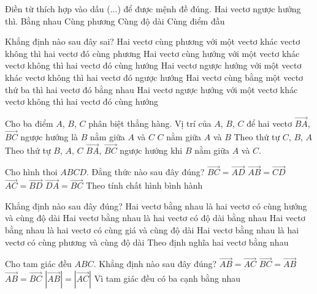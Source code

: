 \begin{ex}%
	Điền từ thích hợp vào dấu (...) để được mệnh đề đúng. Hai vectơ ngược hướng thì.
	\choice
	{Bằng nhau}
	{\True Cùng phương}
	{Cùng độ dài}
	{Cùng điểm đầu}
\end{ex}

\begin{ex}%
	Khẳng định nào sau đây sai?
	\choice
	{Hai vectơ cùng phương với một vectơ khác vectơ không thì hai vectơ đó cùng phương}
	{ Hai vectơ cùng hướng với một vectơ khác vectơ không thì hai vectơ đó cùng hướng}
	{\True Hai vectơ ngược hướng với một vectơ khác vectơ không thì hai vectơ đó ngược hướng}
	{Hai vectơ cùng bằng một vectơ thứ ba thì hai vectơ đó bằng nhau}
	\loigiai
	{Hai vectơ ngược hướng với một vectơ khác vectơ không thì hai vectơ đó cùng hướng}
\end{ex}

\begin{ex}%
	Cho ba điểm $A$, $B$, $C $ phân biệt thẳng hàng. Vị trí của $A$, $B$, $C$ để hai vectơ $\overrightarrow{BA}$, $\overrightarrow{BC}$ ngược hướng là
	\choice
	{\True $B$ nằm giữa $A$ và $C$}
	{$C$ nằm giữa $A$ và $B$}
	{Theo thứ tự $C$, $B$, $A$}
	{Theo thứ tự $B$, $A$, $C$}
	\loigiai
	{$\overrightarrow{BA}$, $\overrightarrow{BC}$ ngược hướng khi $B$ nằm giữa $A $ và $C$.}
\end{ex}


\begin{ex}%
	Cho hình thoi $ABCD$. Đẳng thức nào sau đây đúng?
	\choice
	{\True $\overrightarrow{BC}=\overrightarrow{AD}$}
	{$\overrightarrow{AB}=\overrightarrow{CD}$}
	{$\overrightarrow{AC}=\overrightarrow{BD}$}
	{$\overrightarrow{DA}=\overrightarrow{BC}$}
	\loigiai
	{Theo tính chất hình bình hành}
\end{ex}

\begin{ex}%
	Khẳng định nào sau đây đúng?
	\choice
	{\True Hai vectơ bằng nhau là hai vectơ có cùng hướng và cùng độ dài}
	{Hai vectơ bằng nhau là hai vectơ có độ dài bằng nhau}
	{Hai vectơ bằng nhau là hai vectơ có cùng giá và cùng độ dài}
	{Hai vectơ bằng nhau là hai vectơ có cùng phương và cùng độ dài}
	\loigiai
	{Theo định nghĩa hai vectơ bằng nhau}
\end{ex}

\begin{ex}%
	Cho tam giác đều $ABC$. Khẳng định nào sau đây đúng?
	\choice
	{$\overrightarrow{AB}=\overrightarrow{AC}$}
	{$\overrightarrow{BC}=\overrightarrow{AB}$}
	{$\overrightarrow{AB}=\overrightarrow{BC}$}
	{\True $|\overrightarrow{AB}|=|\overrightarrow{AC}|$}
	\loigiai
	{Vì tam giác đều có ba cạnh bằng nhau }
\end{ex}


